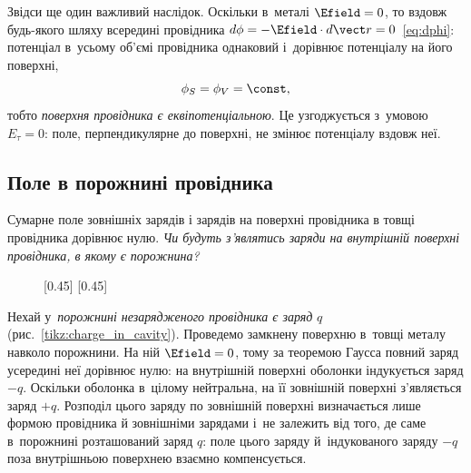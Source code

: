 Звідси ще один важливий наслідок. Оскільки в~металі $\Efield = 0$, то вздовж будь-якого
шляху всередині провідника $d\phi = -\Efield\cdot d\vect r = 0$~\eqref{eq:dphi}: потенціал
в~усьому об'ємі провідника однаковий і~дорівнює потенціалу на його поверхні,
\begin{equation*}
    \phi_S = \phi_V = \const,
\end{equation*}
тобто \emph{поверхня провідника є еквіпотенціальною}. Це узгоджується з~умовою $E_\tau = 0$:
поле, перпендикулярне до поверхні, не змінює потенціалу вздовж неї.


\subsection*{Поле в порожнині провідника}


Сумарне поле зовнішніх зарядів і зарядів на поверхні провідника в товщі провідника
дорівнює нулю. \emph{Чи будуть з'являтись заряди на внутрішній поверхні
    провідника, в якому є порожнина?}

\begin{figure}[h!]\centering
    [0.45\linewidth]{
        \centering
    }
    [0.45\linewidth]{
        \centering
    }
\end{figure}

Нехай у~\emph{порожнині незарядженого провідника є заряд} $q$
(рис.~\ref{tikz:charge_in_cavity}). Проведемо замкнену поверхню в~товщі металу навколо
порожнини. На ній $\Efield = 0$, тому за теоремою Гаусса повний заряд усередині неї
дорівнює нулю: на внутрішній поверхні оболонки індукується заряд $-q$. Оскільки оболонка
в~цілому нейтральна, на її зовнішній поверхні з'являється заряд $+q$. Розподіл цього
заряду по зовнішній поверхні визначається лише формою провідника й зовнішніми зарядами
і~не залежить від того, де саме в~порожнині розташований заряд $q$: поле цього заряду
й~індукованого заряду $-q$ поза внутрішньою поверхнею взаємно компенсується.

